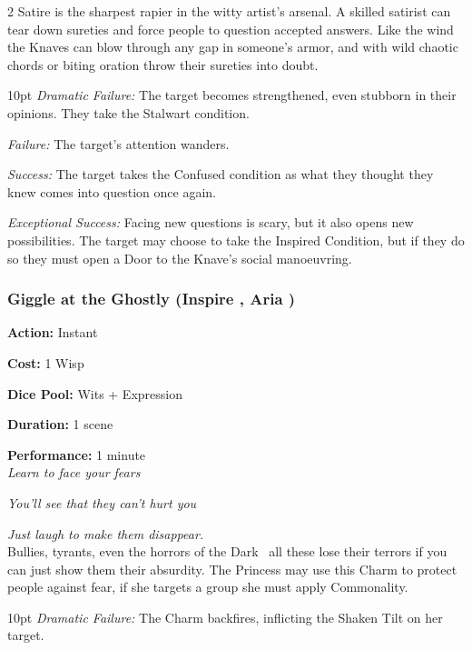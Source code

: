 \begin{multicols}{2}
\noindent Satire is the sharpest rapier in the witty artist's arsenal. A skilled satirist can tear down sureties and force people to question accepted answers. Like the wind the Knaves can blow through any gap in someone's armor, and with wild chaotic chords or biting oration throw their sureties into doubt. 

\begin{myindentpar}{10pt}    \emph{Dramatic Failure:} The target becomes strengthened, even stubborn in their opinions. They take the Stalwart condition. 

    \emph{Failure:} The target’s attention wanders.

    \emph{Success:} The target takes the Confused condition as what they thought they knew comes into question once again.

    \emph{Exceptional Success:} Facing new questions is scary, but it also opens new possibilities. The target may choose to take the Inspired Condition, but if they do so they must open a Door to the Knave's social manoeuvring. 

\end{myindentpar}

\subsubsection*{Giggle at the Ghostly (Inspire \textbullet\textbullet, Aria \textbullet)}

\noindent \textbf{Action:} Instant

\noindent \textbf{Cost:} 1 Wisp

\noindent \textbf{Dice Pool:} Wits + Expression 

\noindent \textbf{Duration:} 1 scene 

\noindent \textbf{Performance:} 1 minute \\	

\textit{Learn to face your fears}

\textit{You'll see that they can't hurt you}

\textit{Just laugh to make them disappear.} \\

\noindent Bullies, tyrants, even the horrors of the Dark \textendash\, all these lose their terrors if you can just show them their absurdity. The Princess may use this Charm to protect people against fear, if she targets a group she must apply Commonality. 

\begin{myindentpar}{10pt}    \emph{Dramatic Failure:} The Charm backfires, inflicting the Shaken Tilt on her target. 


\end{myindentpar}
\end{multicols}
